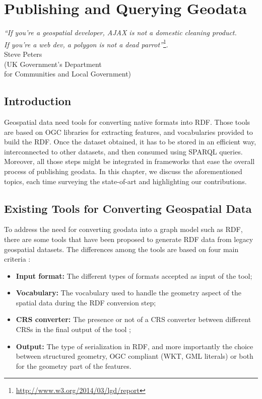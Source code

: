 
\chapter{Publishing and Querying Geodata}
\label{ch:ch2}

\begin{flushright}
\textit{``If you're a geospatial developer, AJAX is not a domestic cleaning product. \\
If you're a web dev, a polygon is not a dead parrot''}\footnote{\url{http://www.w3.org/2014/03/lgd/report}}.\\
Steve Peters \\
(UK Government's Department \\for Communities and Local Government) 

\end{flushright}

\section*{Introduction}
\label{sec:intro-ch2}
Geospatial data need tools for converting native formats into RDF. Those tools are based on OGC libraries for extracting features, and vocabularies provided to build the RDF. Once the dataset obtained, it has to be stored in an efficient way, interconnected to other datasets, and then consumed using SPARQL queries. Moreover, all those steps might be integrated in frameworks that ease the overall process of publishing geodata. In this chapter, we discuss the aforementioned topics, each time surveying the state-of-art and highlighting our contributions. 

\section{Existing Tools for Converting Geospatial Data}
\label{sec:toolgeo}
To address the need for converting geodata into a graph model such as RDF, there are some tools that have been proposed to generate RDF data from legacy geospatial datasets. The differences among the tools are based on four main criteria :
\begin{itemize}
\item \textbf{Input format:} The different types of formats accepted as input of the tool;
\item \textbf{Vocabulary:} The vocabulary used to handle the geometry aspect of the spatial data during the RDF conversion step;
\item \textbf{CRS converter:} The presence or not of a CRS converter between different CRSs in the final output of the tool ;
\item \textbf{Output:} The type of serialization in RDF, and more importantly the choice between structured geometry, OGC compliant (WKT, GML literals) or both for the geometry part of the features.
\end{itemize}

